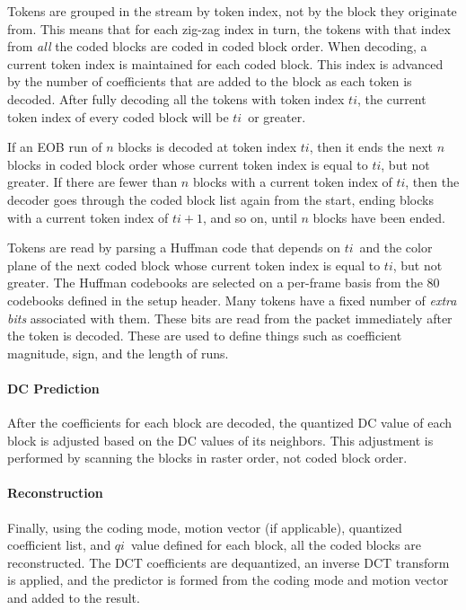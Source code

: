 \documentclass[9pt,letterpaper]{book}
\newcommand{\idx}[1]{{\ensuremath{\mathit{#1}}}}
\newcommand{\qi}{\idx{qi}}
\newcommand{\ti}{\idx{ti}}
\newcommand{\term}[1]{{\em #1}}
\numberwithin{equation}{chapter}
\numberwithin{figure}{chapter}
\numberwithin{table}{chapter}
\begin{document}
Tokens are grouped in the stream by token index, not by the block they
 originate from.
This means that for each zig-zag index in turn, the tokens with that index from
 {\em all} the coded blocks are coded in coded block order.
When decoding, a current token index is maintained for each coded block.
This index is advanced by the number of coefficients that are added to the
 block as each token is decoded.
After fully decoding all the tokens with token index \ti, the current token
 index of every coded block will be \ti\ or greater.

If an EOB run of $n$ blocks is decoded at token index \ti, then it ends the
 next $n$ blocks in coded block order whose current token index is equal to
 \ti, but not greater.
If there are fewer than $n$ blocks with a current token index of \ti, then the
 decoder goes through the coded block list again from the start, ending blocks
 with a current token index of $\ti+1$, and so on, until $n$ blocks have been
 ended.

Tokens are read by parsing a Huffman code that depends on \ti\ and the color
 plane of the next coded block whose current token index is equal to \ti, but
 not greater.
The Huffman codebooks are selected on a per-frame basis from the 80 codebooks
 defined in the setup header.
Many tokens have a fixed number of \term{extra bits} associated with them.
These bits are read from the packet immediately after the token is decoded.
These are used to define things such as coefficient magnitude, sign, and the
 length of runs.

\paragraph{DC Prediction}

After the coefficients for each block are decoded, the quantized DC value of
 each block is adjusted based on the DC values of its neighbors.
This adjustment is performed by scanning the blocks in raster order, not coded
 block order.

\paragraph{Reconstruction}

Finally, using the coding mode, motion vector (if applicable), quantized
 coefficient list, and \qi\ value defined for each block, all the coded blocks
 are reconstructed.
The DCT coefficients are dequantized, an inverse DCT transform is applied, and
 the predictor is formed from the coding mode and motion vector and added to
 the result.
\end{document}
